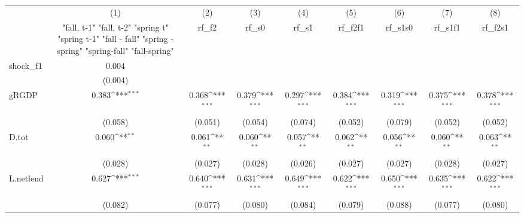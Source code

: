 {
\def\sym#1{\ifmmode^{#1}\else\(^{#1}\)\fi}
\begin{tabular}{l*{8}{c}}
\toprule
            &\multicolumn{1}{c}{(1)}&\multicolumn{1}{c}{(2)}&\multicolumn{1}{c}{(3)}&\multicolumn{1}{c}{(4)}&\multicolumn{1}{c}{(5)}&\multicolumn{1}{c}{(6)}&\multicolumn{1}{c}{(7)}&\multicolumn{1}{c}{(8)}\\
            &\multicolumn{1}{c}{  "fall, t-1" "fall, t-2" "spring t" "spring t-1"  "fall - fall" "spring - spring" "spring-fall" "fall-spring" }&\multicolumn{1}{c}{rf\_f2}&\multicolumn{1}{c}{rf\_s0}&\multicolumn{1}{c}{rf\_s1}&\multicolumn{1}{c}{rf\_f2f1}&\multicolumn{1}{c}{rf\_s1s0}&\multicolumn{1}{c}{rf\_s1f1}&\multicolumn{1}{c}{rf\_f2s1}\\
\midrule
shock\_f1    &       0.004         &                     &                     &                     &                     &                     &                     &                     \\
            &     (0.004)         &                     &                     &                     &                     &                     &                     &                     \\
\addlinespace
gRGDP       &       0.383\sym{***}&       0.368\sym{***}&       0.379\sym{***}&       0.297\sym{***}&       0.384\sym{***}&       0.319\sym{***}&       0.375\sym{***}&       0.378\sym{***}\\
            &     (0.058)         &     (0.051)         &     (0.054)         &     (0.074)         &     (0.052)         &     (0.079)         &     (0.052)         &     (0.052)         \\
\addlinespace
D.tot       &       0.060\sym{**} &       0.061\sym{**} &       0.060\sym{**} &       0.057\sym{**} &       0.062\sym{**} &       0.056\sym{**} &       0.060\sym{**} &       0.063\sym{**} \\
            &     (0.028)         &     (0.027)         &     (0.028)         &     (0.026)         &     (0.027)         &     (0.027)         &     (0.028)         &     (0.027)         \\
\addlinespace
L.netlend   &       0.627\sym{***}&       0.640\sym{***}&       0.631\sym{***}&       0.649\sym{***}&       0.622\sym{***}&       0.650\sym{***}&       0.635\sym{***}&       0.622\sym{***}\\
            &     (0.082)         &     (0.077)         &     (0.080)         &     (0.084)         &     (0.079)         &     (0.088)         &     (0.077)         &     (0.080)         \\

\end{tabular}}
